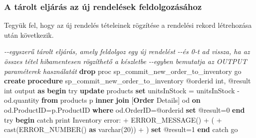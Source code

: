 \documentclass[
  magyar,
]{article}
\newenvironment{Shaded}{}{}
\newcommand{\CommentTok}[1]{\textcolor[rgb]{0.38,0.63,0.69}{\textit{#1}}}
\newcommand{\ControlFlowTok}[1]{\textcolor[rgb]{0.00,0.44,0.13}{\textbf{#1}}}
\newcommand{\DataTypeTok}[1]{\textcolor[rgb]{0.56,0.13,0.00}{#1}}
\newcommand{\DecValTok}[1]{\textcolor[rgb]{0.25,0.63,0.44}{#1}}
\newcommand{\FunctionTok}[1]{\textcolor[rgb]{0.02,0.16,0.49}{#1}}
\newcommand{\KeywordTok}[1]{\textcolor[rgb]{0.00,0.44,0.13}{\textbf{#1}}}
\newcommand{\NormalTok}[1]{#1}
\newcommand{\OperatorTok}[1]{\textcolor[rgb]{0.40,0.40,0.40}{#1}}
\newcommand{\OtherTok}[1]{\textcolor[rgb]{0.00,0.44,0.13}{#1}}
\newcommand{\StringTok}[1]{\textcolor[rgb]{0.25,0.44,0.63}{#1}}
\begin{document}
\subsubsection{A tárolt eljárás az új rendelések
feldolgozásához}\label{a-tuxe1rolt-eljuxe1ruxe1s-az-uxfaj-rendeluxe9sek-feldolgozuxe1suxe1hoz}

Tegyük fel, hogy az új rendelés tételeinek rögzítése a rendelési rekord
létrehozása után következik.

\begin{Shaded}
\begin{Highlighting}[]
\CommentTok{{-}{-}egyszerű tárolt eljárás, amely feldolgoz egy új rendelést}
\CommentTok{{-}{-}és 0{-}t ad vissza, ha az összes tétel hibamentesen rögzíthető a készletbe}
\CommentTok{{-}{-}egyben bemutatja az OUTPUT paraméterek használatát}
\KeywordTok{drop}\NormalTok{ proc sp\_commit\_new\_order\_to\_inventory}
\NormalTok{go}
\KeywordTok{create} \KeywordTok{procedure}\NormalTok{ sp\_commit\_new\_order\_to\_inventory}
\OtherTok{@orderid int,}
\OtherTok{@result int output}
\KeywordTok{as}
\ControlFlowTok{begin}\NormalTok{ try}
    \KeywordTok{update}\NormalTok{ products }\KeywordTok{set}\NormalTok{ unitsInStock }\OperatorTok{=}\NormalTok{ unitsInStock }\OperatorTok{{-}}\NormalTok{ od.quantity}
    \KeywordTok{from}\NormalTok{ products p }\KeywordTok{inner} \KeywordTok{join}\NormalTok{ [}\KeywordTok{Order}\NormalTok{ Details] od }\KeywordTok{on}\NormalTok{ od.ProductID}\OperatorTok{=}\NormalTok{p.ProductID}
    \KeywordTok{where}\NormalTok{ od.OrderID}\OperatorTok{=}\NormalTok{@orderid}
    \KeywordTok{set}\NormalTok{ @result}\OperatorTok{=}\DecValTok{0}
\ControlFlowTok{end}\NormalTok{ try}
\ControlFlowTok{begin}\NormalTok{ catch}
\NormalTok{    print }\StringTok{\textquotesingle{} Inventory error: \textquotesingle{}}\OperatorTok{+}\NormalTok{ ERROR\_MESSAGE() }\OperatorTok{+} \StringTok{\textquotesingle{} (\textquotesingle{}} \OperatorTok{+} \FunctionTok{cast}\NormalTok{(ERROR\_NUMBER() }\KeywordTok{as} \DataTypeTok{varchar}\NormalTok{(}\DecValTok{20}\NormalTok{)) }\OperatorTok{+} \StringTok{\textquotesingle{})\textquotesingle{}}
    \KeywordTok{set}\NormalTok{ @result}\OperatorTok{=}\DecValTok{1}
\ControlFlowTok{end}\NormalTok{ catch}
\NormalTok{go}


\end{Highlighting}
\end{Shaded}
\end{document}
